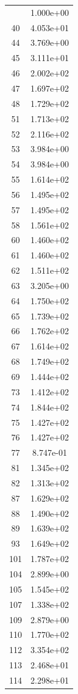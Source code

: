 \documentclass[12pt]{article}
\begin{document}
\begin{longtable}{@{}cc@{}}
\bottomrule
\endlastfoot
1 & 1.000e+00 \\
40 & 4.053e+01 \\
44 & 3.769e+00 \\
45 & 3.111e+01 \\
46 & 2.002e+02 \\
47 & 1.697e+02 \\
48 & 1.729e+02 \\
51 & 1.713e+02 \\
52 & 2.116e+02 \\
53 & 3.984e+00 \\
54 & 3.984e+00 \\
55 & 1.614e+02 \\
56 & 1.495e+02 \\
57 & 1.495e+02 \\
58 & 1.561e+02 \\
60 & 1.460e+02 \\
61 & 1.460e+02 \\
62 & 1.511e+02 \\
63 & 3.205e+00 \\
64 & 1.750e+02 \\
65 & 1.739e+02 \\
66 & 1.762e+02 \\
67 & 1.614e+02 \\
68 & 1.749e+02 \\
69 & 1.444e+02 \\
73 & 1.412e+02 \\
74 & 1.844e+02 \\
75 & 1.427e+02 \\
76 & 1.427e+02 \\
77 & 8.747e-01 \\
81 & 1.345e+02 \\
82 & 1.313e+02 \\
87 & 1.629e+02 \\
88 & 1.490e+02 \\
89 & 1.639e+02 \\
93 & 1.649e+02 \\
101 & 1.787e+02 \\
104 & 2.899e+00 \\
105 & 1.545e+02 \\
107 & 1.338e+02 \\
109 & 2.879e+00 \\
110 & 1.770e+02 \\
112 & 3.354e+02 \\
113 & 2.468e+01 \\
114 & 2.298e+01 \\

\end{longtable}
\end{document}
